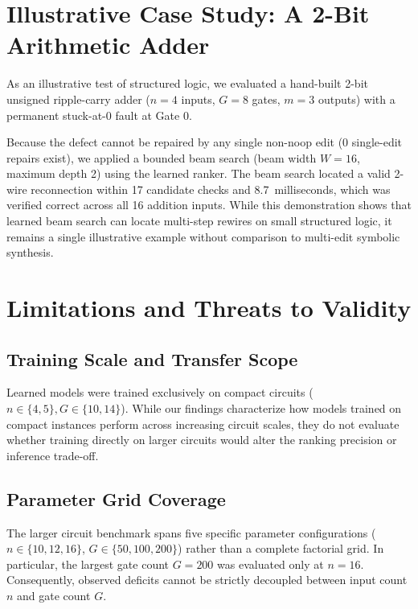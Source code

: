 \documentclass[11pt,a4paper]{article}
\begin{document}
\section{Illustrative Case Study: A 2-Bit Arithmetic Adder}
As an illustrative test of structured logic, we evaluated a hand-built 2-bit unsigned ripple-carry adder ($n=4$ inputs, $G=8$ gates, $m=3$ outputs) with a permanent stuck-at-0 fault at Gate 0. 

Because the defect cannot be repaired by any single non-noop edit (0 single-edit repairs exist), we applied a bounded beam search (beam width $W=16$, maximum depth 2) using the learned ranker. The beam search located a valid 2-wire reconnection within 17 candidate checks and 8.7~milliseconds, which was verified correct across all 16 addition inputs. While this demonstration shows that learned beam search can locate multi-step rewires on small structured logic, it remains a single illustrative example without comparison to multi-edit symbolic synthesis.

\section{Limitations and Threats to Validity}

\subsection{Training Scale and Transfer Scope}
Learned models were trained exclusively on compact circuits ($n \in \{4, 5\}, G \in \{10, 14\}$). While our findings characterize how models trained on compact instances perform across increasing circuit scales, they do not evaluate whether training directly on larger circuits would alter the ranking precision or inference trade-off.

\subsection{Parameter Grid Coverage}
The larger circuit benchmark spans five specific parameter configurations ($n \in \{10, 12, 16\}$, $G \in \{50, 100, 200\}$) rather than a complete factorial grid. In particular, the largest gate count $G=200$ was evaluated only at $n=16$. Consequently, observed deficits cannot be strictly decoupled between input count $n$ and gate count $G$.
\end{document}
